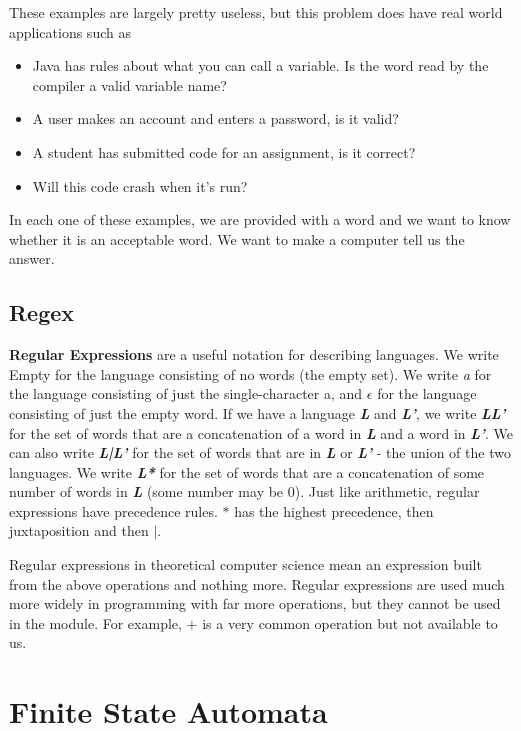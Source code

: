 \documentclass[11pt]{article}
\begin{document}
	These examples are largely pretty useless, but this problem does have real world applications such as 
	\begin{itemize}
		\item Java has rules about what you can call a variable. Is the word read by the compiler a valid variable name?
		\item A user makes an account and enters a password, is it valid?
		\item A student has submitted code for an assignment, is it correct?
		\item Will this code crash when it's run?
	\end{itemize}
	
	In each one of these examples, we are provided with a word and we want to know whether it is an acceptable word. We want to make a computer tell us the answer.
	
	\subsection{Regex}
	\textbf{Regular Expressions} are a useful notation for describing languages. We write Empty for the language consisting of no words (the empty set). We write \textit{a} for the language consisting of just the single-character a, and $\epsilon$ for the language consisting of just the empty word. If we have a language \textit{\textbf{L}} and \textit{\textbf{L'}}, we write \textit{\textbf{LL'}} for the set of words that are a concatenation of a word in \textit{\textbf{L}} and a word in \textit{\textbf{L'}}. We can also write \textit{\textbf{L|L'}} for the set of words that are in \textit{\textbf{L}} or \textit{\textbf{L'}} - the union of the two languages. We write \textit{\textbf{L*}} for the set of words that are a concatenation of some number of words in \textit{\textbf{L}} (some number may be 0).
	Just like arithmetic, regular expressions have precedence rules. $*$ has the highest precedence, then juxtaposition and then $|$.
	
	\par 
	Regular expressions in theoretical computer science mean an expression built from the above operations and nothing more. Regular expressions are used much more widely in programming with far more operations, but they cannot be used in the module. For example, $+$ is a very common operation but not available to us.
	
	
	\section{Finite State Automata}
\end{document}
